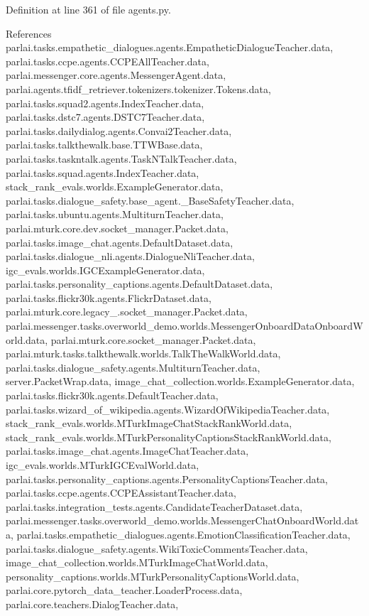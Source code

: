 Definition at line 361 of file agents.\+py.



References parlai.\+tasks.\+empathetic\+\_\+dialogues.\+agents.\+Empathetic\+Dialogue\+Teacher.\+data, parlai.\+tasks.\+ccpe.\+agents.\+C\+C\+P\+E\+All\+Teacher.\+data, parlai.\+messenger.\+core.\+agents.\+Messenger\+Agent.\+data, parlai.\+agents.\+tfidf\+\_\+retriever.\+tokenizers.\+tokenizer.\+Tokens.\+data, parlai.\+tasks.\+squad2.\+agents.\+Index\+Teacher.\+data, parlai.\+tasks.\+dstc7.\+agents.\+D\+S\+T\+C7\+Teacher.\+data, parlai.\+tasks.\+dailydialog.\+agents.\+Convai2\+Teacher.\+data, parlai.\+tasks.\+talkthewalk.\+base.\+T\+T\+W\+Base.\+data, parlai.\+tasks.\+taskntalk.\+agents.\+Task\+N\+Talk\+Teacher.\+data, parlai.\+tasks.\+squad.\+agents.\+Index\+Teacher.\+data, stack\+\_\+rank\+\_\+evals.\+worlds.\+Example\+Generator.\+data, parlai.\+tasks.\+dialogue\+\_\+safety.\+base\+\_\+agent.\+\_\+\+Base\+Safety\+Teacher.\+data, parlai.\+tasks.\+ubuntu.\+agents.\+Multiturn\+Teacher.\+data, parlai.\+mturk.\+core.\+dev.\+socket\+\_\+manager.\+Packet.\+data, parlai.\+tasks.\+image\+\_\+chat.\+agents.\+Default\+Dataset.\+data, parlai.\+tasks.\+dialogue\+\_\+nli.\+agents.\+Dialogue\+Nli\+Teacher.\+data, igc\+\_\+evals.\+worlds.\+I\+G\+C\+Example\+Generator.\+data, parlai.\+tasks.\+personality\+\_\+captions.\+agents.\+Default\+Dataset.\+data, parlai.\+tasks.\+flickr30k.\+agents.\+Flickr\+Dataset.\+data, parlai.\+mturk.\+core.\+legacy\+\_.\+socket\+\_\+manager.\+Packet.\+data, parlai.\+messenger.\+tasks.\+overworld\+\_\+demo.\+worlds.\+Messenger\+Onboard\+Data\+Onboard\+World.\+data, parlai.\+mturk.\+core.\+socket\+\_\+manager.\+Packet.\+data, parlai.\+mturk.\+tasks.\+talkthewalk.\+worlds.\+Talk\+The\+Walk\+World.\+data, parlai.\+tasks.\+dialogue\+\_\+safety.\+agents.\+Multiturn\+Teacher.\+data, server.\+Packet\+Wrap.\+data, image\+\_\+chat\+\_\+collection.\+worlds.\+Example\+Generator.\+data, parlai.\+tasks.\+flickr30k.\+agents.\+Default\+Teacher.\+data, parlai.\+tasks.\+wizard\+\_\+of\+\_\+wikipedia.\+agents.\+Wizard\+Of\+Wikipedia\+Teacher.\+data, stack\+\_\+rank\+\_\+evals.\+worlds.\+M\+Turk\+Image\+Chat\+Stack\+Rank\+World.\+data, stack\+\_\+rank\+\_\+evals.\+worlds.\+M\+Turk\+Personality\+Captions\+Stack\+Rank\+World.\+data, parlai.\+tasks.\+image\+\_\+chat.\+agents.\+Image\+Chat\+Teacher.\+data, igc\+\_\+evals.\+worlds.\+M\+Turk\+I\+G\+C\+Eval\+World.\+data, parlai.\+tasks.\+personality\+\_\+captions.\+agents.\+Personality\+Captions\+Teacher.\+data, parlai.\+tasks.\+ccpe.\+agents.\+C\+C\+P\+E\+Assistant\+Teacher.\+data, parlai.\+tasks.\+integration\+\_\+tests.\+agents.\+Candidate\+Teacher\+Dataset.\+data, parlai.\+messenger.\+tasks.\+overworld\+\_\+demo.\+worlds.\+Messenger\+Chat\+Onboard\+World.\+data, parlai.\+tasks.\+empathetic\+\_\+dialogues.\+agents.\+Emotion\+Classification\+Teacher.\+data, parlai.\+tasks.\+dialogue\+\_\+safety.\+agents.\+Wiki\+Toxic\+Comments\+Teacher.\+data, image\+\_\+chat\+\_\+collection.\+worlds.\+M\+Turk\+Image\+Chat\+World.\+data, personality\+\_\+captions.\+worlds.\+M\+Turk\+Personality\+Captions\+World.\+data, parlai.\+core.\+pytorch\+\_\+data\+\_\+teacher.\+Loader\+Process.\+data, parlai.\+core.\+teachers.\+Dialog\+Teacher.\+data, 